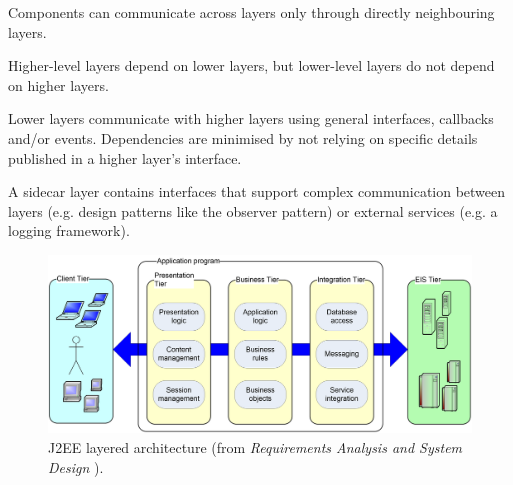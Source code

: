 \documentclass{slide}
\begin{document}
{Components can communicate across layers only through directly neighbouring layers.}

{Higher-level layers depend on lower layers, but lower-level layers do not depend on higher layers.}

{Lower layers communicate with higher layers using general interfaces, callbacks and/or events.
Dependencies are minimised by not relying on specific details published in a higher layer’s interface.}

{A sidecar layer contains interfaces that support complex communication between layers
(e.g. design patterns like the observer pattern) or external services (e.g. a logging framework).}



\begin{frame}

\begin{figure}
    \begin{adjustwidth}{-7mm}{-7mm}
        \includegraphics[width=0.96\paperwidth]{images/j2ee-arch.png}
    \end{adjustwidth}
    \caption{J2EE layered architecture (from \textit{Requirements Analysis and System Design} \cite{rasd2007}).}
\end{figure}

\end{frame}
\end{document}
